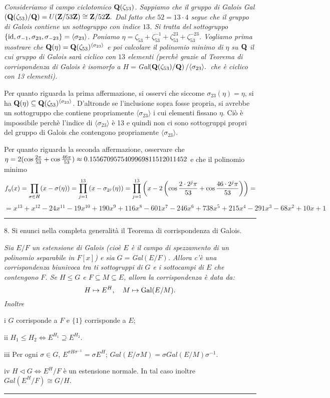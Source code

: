 {\it Consideriamo il campo ciclotomico ${\bf Q}(\zeta_{53})$. Sappiamo
che il gruppo di Galois Gal$({\bf Q}(\zeta_{53})/{\bf Q})= U({\bf Z}/53{\bf
Z})\cong {\bf Z}/52{\bf Z}.$ Dal fatto che $52=13\cdot4$ segue che
il gruppo di Galois contiene un sottogruppo con indice $13$. Si
tratta del sottogruppo $\{{\rm id},\sigma_{-1},\sigma_{23},
\sigma_{-23}\}=\langle\sigma_{23}\rangle$. Poniamo
$\eta=\zeta_{53}+\zeta_{53}^{-1}+\zeta_{53}^{23}+\zeta_{53}^{-23}$.
Vogliamo prima mostrare che ${\bf Q}(\eta)={\bf
Q}(\zeta_{53})^{\langle\sigma_{23}\rangle}$ e poi calcolare il
polinomio minimo di $\eta$ su ${\bf Q}$ il cui gruppo di Galois
sar\`{a} ciclico con $13$ elementi (perch\`{e} grazie al Teorema
di corrispondenza di Galois \`{e} isomorfo a
$H=$Gal$({\bf Q}(\zeta_{53})/{\bf Q})\left/\langle\sigma_{23}\rangle.\right.$
che \`{e} ciclico con 13 elementi).

Per quanto riguarda la prima affermazione, si osservi che siccome
$\sigma_{23}(\eta)=\eta$, si ha ${\bf Q}(\eta)\subseteq{\bf
Q}(\zeta_{53})^{\langle\sigma_{23}\rangle}$. D'altronde se
l'inclusione sopra fosse propria, si avrebbe un sottogruppo che
contiene propriamente $\langle\sigma_{23}\rangle$ i cui elementi
fissano $\eta$. Ci\`{o} \`{e} impossibile perch\`{e} l'indice di
$\langle\sigma_{23}\rangle$ \`{e} 13 e quindi non ci sono
sottogruppi propri del gruppo di Galois che contengono
propriamente $\langle\sigma_{23}\rangle$.

Per quanto riguarda la seconda affermazione, osservare che
$\eta=2(\cos {2\pi\over53}+\cos {46\pi\over53})\approx
0.1556709575409969811512011452$  e che il polinomio minimo
$$f_\eta(x)=\prod_{\sigma\in H}(x-\sigma(\eta))=\prod_{j=1}^{13}\left(
x-\sigma_{2^j}(\eta)\right) =\prod_{j=1}^{13}\left(x-2\left(\cos
{2 \cdot2^j\pi\over53}+\cos
{46\cdot2^j\pi\over53}\right)\right)=$$
$$=x^{13} + x^{12} - {24}x^{11} - {19}x^{10} + {190}x^{9} +
{116}x^{8} - {601}x^{7 } - {246}x^{6} + {738}x^{5} + {215}x^{4} -
{291}x^{3} - {68}x^{2} + {10}x + 1
$$}
\medskip\hrule
\medskip

 \item{8.} Si enunci nella completa
generalit\`{a} il Teorema di corrispondenza di Galois.

 {\it Sia $E/F$ un estensione di Galois
(cio\`{e} $E$ \`{e} il campo di spezzamento di un polinomio
separabile in $F[x]$) e sia $G=$Gal$(E/F)$. Allora c'\`{e} una
corrispondenza biunivoca tra ti sottogruppi di $G$ e i sottocampi
di $E$ che contengono $F$. Se $H\leq G$ e $F\subseteq M\subseteq
E$, allora la corrispondenza \`{e} data da:
$$H\mapsto E^H,\quad M\mapsto {\rm Gal}(E/M).$$
Inoltre \item{i} $G$ corrisponde a $F$ e $\{1\}$ corrisponde a
$E$; \item{ii} $H_1\leq H_2 \Leftrightarrow E^{H_1}\supseteq
E^{H_2}.$ \item{iii} Per ogni $\sigma\in G$,
    \itemitem{-} $E^{\sigma H\sigma^{-1}}=\sigma E^H$;
    \itemitem{-} $Gal(E/\sigma M)=\sigma Gal(E/M)\sigma^{-1}$.
\item{iv} $H\triangleleft G \Leftrightarrow E^H/F$ \`{e} un
estensione normale. In tal caso inoltre $Gal(E^H/F)\cong G/H.$}
\medskip\hrule
\medskip

